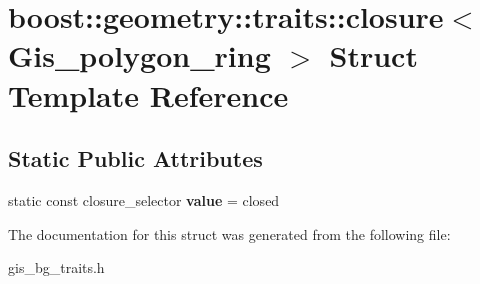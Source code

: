 \hypertarget{structboost_1_1geometry_1_1traits_1_1closure_3_01Gis__polygon__ring_01_4}{}\section{boost\+:\+:geometry\+:\+:traits\+:\+:closure$<$ Gis\+\_\+polygon\+\_\+ring $>$ Struct Template Reference}
\label{structboost_1_1geometry_1_1traits_1_1closure_3_01Gis__polygon__ring_01_4}
\subsection*{Static Public Attributes}
\begin{DoxyCompactItemize}
\item 
\mbox{\label{structboost_1_1geometry_1_1traits_1_1closure_3_01Gis__polygon__ring_01_4_a27b5c2425bc5296536a4abef844db4ce}} 
static const closure\+\_\+selector {\bfseries value} = closed
\end{DoxyCompactItemize}


The documentation for this struct was generated from the following file\+:\begin{DoxyCompactItemize}
\item 
gis\+\_\+bg\+\_\+traits.\+h\end{DoxyCompactItemize}
